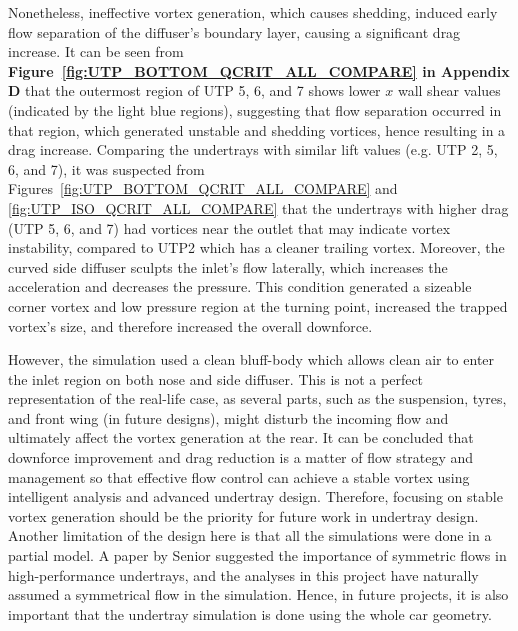 \noindent Nonetheless, ineffective vortex generation, which causes shedding, induced early flow separation of the diffuser's boundary layer, causing a significant drag increase. It can be seen from \textbf{Figure~\ref{fig:UTP_BOTTOM_QCRIT_ALL_COMPARE} in Appendix D} that the outermost region of UTP 5, 6, and 7 shows lower $x$ wall shear values (indicated by the light blue regions), suggesting that flow separation occurred in that region, which generated unstable and shedding vortices, hence resulting in a drag increase. Comparing the undertrays with similar lift values (e.g. UTP 2, 5, 6, and 7), it was suspected from Figures~\ref{fig:UTP_BOTTOM_QCRIT_ALL_COMPARE} and \ref{fig:UTP_ISO_QCRIT_ALL_COMPARE} that the undertrays with higher drag (UTP 5, 6, and 7) had vortices near the outlet that may indicate vortex instability, compared to UTP2 which has a cleaner trailing vortex. Moreover, the curved side diffuser sculpts the inlet's flow laterally, which increases the acceleration and decreases the pressure. This condition generated a sizeable corner vortex and low pressure region at the turning point, increased the trapped vortex's size, and therefore increased the overall downforce.

\noindent However, the simulation used a clean bluff-body which allows clean air to enter the inlet region on both nose and side diffuser. This is not a perfect representation of the real-life case, as several parts, such as the suspension, tyres, and front wing (in future designs), might disturb the incoming flow and ultimately affect the vortex generation at the rear. It can be concluded that downforce improvement and drag reduction is a matter of flow strategy and management so that effective flow control can achieve a stable vortex using intelligent analysis and advanced undertray design. Therefore, focusing on stable vortex generation should be the priority for future work in undertray design. Another limitation of the design here is that all the simulations were done in a partial model. A paper by Senior \cite{Senior2001TheEffect} suggested the importance of symmetric flows in high-performance undertrays, and the analyses in this project have naturally assumed a symmetrical flow in the simulation. Hence, in future projects, it is also important that the undertray simulation is done using the whole car geometry.
















